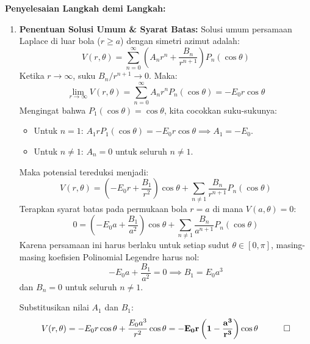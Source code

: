 \documentclass[11pt,a4paper]{article}
\theoremstyle{definition}
\begin{document}
\noindent\textbf{Penyelesaian Langkah demi Langkah:}
\begin{enumerate}[leftmargin=*]
    \item \textbf{Penentuan Solusi Umum \& Syarat Batas:}
    Solusi umum persamaan Laplace di luar bola ($r \ge a$) dengan simetri azimut adalah:
    \begin{equation*}
        V(r, \theta) = \sum_{n=0}^{\infty} \left( A_n r^n + \frac{B_n}{r^{n+1}} \right) P_n(\cos\theta)
    \end{equation*}
    Ketika $r \to \infty$, suku $B_n/r^{n+1} \to 0$. Maka:
    \begin{equation*}
        \lim_{r \to \infty} V(r, \theta) = \sum_{n=0}^{\infty} A_n r^n P_n(\cos\theta) = -E_0 r \cos\theta
    \end{equation*}
    Mengingat bahwa $P_1(\cos\theta) = \cos\theta$, kita cocokkan suku-sukunya:
    \begin{itemize}
        \item Untuk $n = 1$: $A_1 r P_1(\cos\theta) = -E_0 r \cos\theta \implies A_1 = -E_0$.
        \item Untuk $n \neq 1$: $A_n = 0$ untuk seluruh $n \neq 1$.
    \end{itemize}
    Maka potensial tereduksi menjadi:
    \begin{equation*}
        V(r, \theta) = \left( -E_0 r + \frac{B_1}{r^2} \right) \cos\theta + \sum_{n \neq 1} \frac{B_n}{r^{n+1}} P_n(\cos\theta)
    \end{equation*}
    Terapkan syarat batas pada permukaan bola $r = a$ di mana $V(a, \theta) = 0$:
    \begin{equation*}
        0 = \left( -E_0 a + \frac{B_1}{a^2} \right) \cos\theta + \sum_{n \neq 1} \frac{B_n}{a^{n+1}} P_n(\cos\theta)
    \end{equation*}
    Karena persamaan ini harus berlaku untuk setiap sudut $\theta \in [0, \pi]$, masing-masing koefisien Polinomial Legendre harus nol:
    \begin{equation*}
        -E_0 a + \frac{B_1}{a^2} = 0 \implies B_1 = E_0 a^3
    \end{equation*}
    dan $B_n = 0$ untuk seluruh $n \neq 1$.
    
    Substitusikan nilai $A_1$ dan $B_1$:
    \begin{equation*}
        V(r, \theta) = -E_0 r \cos\theta + \frac{E_0 a^3}{r^2} \cos\theta = \mathbf{-E_0 r \left( 1 - \frac{a^3}{r^3} \right) \cos\theta} \quad \qed
    \end{equation*}


\end{enumerate}
\end{document}
